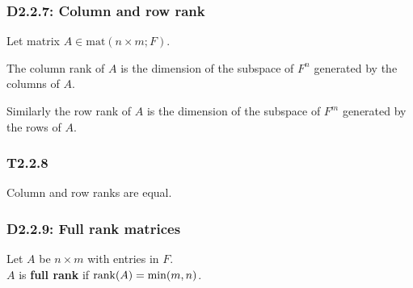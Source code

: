 \documentclass{article}
\begin{document}
\begin{multicols*}{3}
\subsubsection*{D2.2.7: Column and row rank}
Let matrix $A\in\text{mat}(n\times m;F)$.

The column rank of $A$ is the dimension of the subspace
of $F^n$ generated by the columns of $A$.

Similarly the row rank of $A$ is the dimension of the subspace
of $F^m$ generated by the rows of $A$.

\subsubsection*{T2.2.8}
Column and row ranks are equal.

\subsubsection*{D2.2.9: Full rank matrices}
Let $A$ be $n\times m$ with entries in $F$. \\
$A$ is \textbf{full rank} if $\rank(A)=\min(m,n)$.

\end{multicols*}
\end{document}
